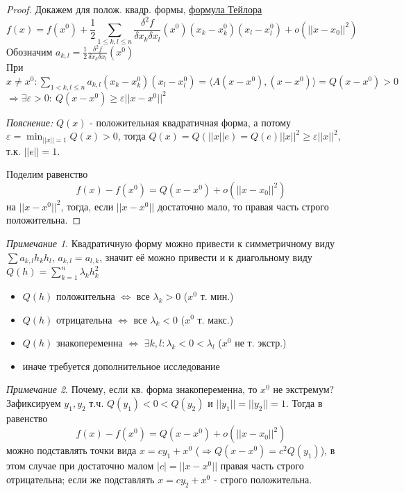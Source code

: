 \documentclass{article}
\theoremstyle{indented}
\theoremstyle{definition}
\theoremstyle{remark}
\newtheorem*{remark}{Примечание}
\newcommand{\hlink}[2]{\hyperlink{#1}{#2}}
\begin{document}
\begin{proof}
    Докажем для полож. квадр. формы, \hlink{taylor}{формула Тейлора}
    \[
        f(x) = f(x^0) + \frac{1}{2} \sum\limits_{1 \leq k,l \leq n} \frac{\delta^2 f}{\delta x_k \delta x_l} (x^0) (x_k-x_k^0) (x_l-x_l^0) + o(||x-x_0||^2)
    \]
    Обозначим $a_{k,l} = \frac{1}{2} \frac{\delta^2 f}{\delta x_k \delta x_l} (x^0)$\\
    При $x\not=x^0: \sum\limits_{1 < k,l\leq n} a_{k,l} (x_k-x_k^0) (x_l-x_l^0) = \langle A(x-x^0), (x-x^0) \rangle = Q(x-x^0) > 0$
    $\Rightarrow \exists \varepsilon>0: \ Q(x-x^0) \geq \varepsilon ||x-x^0||^2$

    \textit{Пояснение: } $Q(x)$ - положительная квадратичная форма, а потому 
    $\displaystyle \varepsilon = \min_{||x||=1} Q(x) > 0$,
    тогда $Q(x)=Q(||x||e)=Q(e)||x||^2 \geq \varepsilon ||x||^2$, т.к. $||e||=1$.

    Поделим равенство
    \[
        f(x) - f(x^0) = Q(x-x^0) + o(||x-x_0||^2)
    \]
    на $||x-x^0||^2$, тогда, если $||x-x^0||$ достаточно мало, то правая часть строго положительна.
\end{proof}

\begin{remark}
    Квадратичную форму можно привести к симметричному виду $\sum a_{k,l} h_k h_l$,  $a_{k,l}=a_{l,k}$,
    значит её можно привести и к диагольному виду $Q(h) = \sum_{k=1}^n \lambda_k h_k^2$
    \begin{itemize}
        \item $Q(h)$ положительна $\Leftrightarrow$ все $\lambda_k > 0$ ($x^0$ т. мин.)
        \item $Q(h)$ отрицательна $\Leftrightarrow$ все $\lambda_k < 0$ ($x^0$ т. макс.)
        \item $Q(h)$ знакопеременна $\Leftrightarrow$ $\exists k,l: \lambda_k < 0 < \lambda_l$ ($x^0$ не т. экстр.)
        \item иначе требуется дополнительное исследование
    \end{itemize}
\end{remark}

\begin{remark}
    Почему, если кв. форма знакопеременна, то $x^0$ не экстремум? Зафиксируем $y_1, y_2$ т.ч. $Q(y_1) < 0 < Q(y_2)$ и $||y_1||=||y_2||=1$.
    Тогда в равенство
    \[
        f(x) - f(x^0) = Q(x-x^0) + o(||x-x_0||^2)
    \]
    можно подставлять точки вида $x=cy_1+x^0$ ($\Rightarrow Q(x-x^0)=c^2 Q(y_1)$), в этом случае при достаточно малом $|c|=||x-x^0||$
    правая часть строго отрицательна; если же подставлять $x=cy_2+x^0$ - строго положительна.
\end{remark}
\end{document}
